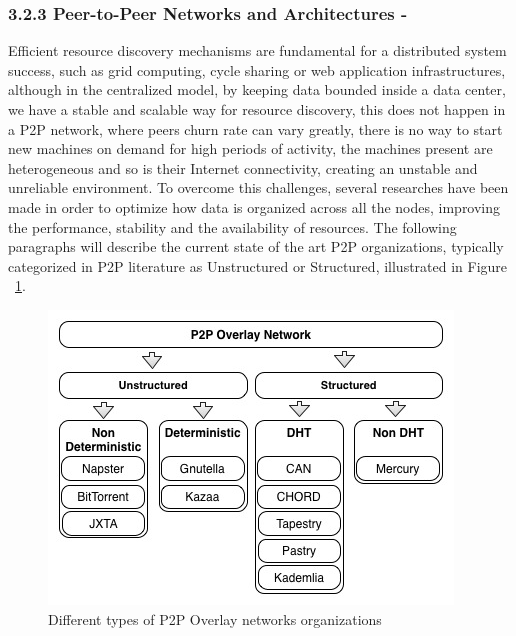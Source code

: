 \documentclass{./llncs2e/llncs}
\begin{document}
\subsubsection{3.2.3 Peer-to-Peer Networks and Architectures -}  
Efficient resource discovery mechanisms are fundamental for a distributed system success, such as grid computing, cycle sharing or web application infrastructures\cite{Ranjan2006}, although in the centralized model, by keeping data bounded inside a data center, we have a stable and scalable way for resource discovery, this does not happen in a P2P network, where peers churn rate can vary greatly, there is no way to start new machines on demand for high periods of activity, the machines present are heterogeneous and so is their Internet connectivity, creating an unstable and unreliable environment. To overcome this challenges, several researches have been made in order to optimize how data is organized across all the nodes, improving the performance, stability and the availability of resources. The following paragraphs will describe the current state of the art P2P organizations, typically categorized in P2P literature as Unstructured or Structured\cite{Milojicic2003}, illustrated in Figure ~\ref{fig:Different types of P2P Overlay networks organizations}.

\begin{figure}[bh!]
  \begin{center}
    \includegraphics[width=\textwidth]{./img/p2porganizations.jpg}
  \end{center}
  \caption{Different types of P2P Overlay networks organizations}
  \label{fig:Different types of P2P Overlay networks organizations}
\end{figure}
\end{document}
